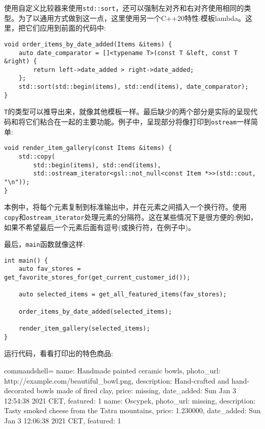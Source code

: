 使用自定义比较器来使用\texttt{std::sort}，还可以强制左对齐和右对齐使用相同的类型。为了以通用方式做到这一点，这里使用另一个C++20特性:模板lambda。这里，把它们应用到前面的代码中:

\begin{lstlisting}[style=styleCXX]
void order_items_by_date_added(Items &items) {
	auto date_comparator = []<typename T>(const T &left, const T &right) {
		return left->date_added > right->date_added;
	};
	std::sort(std::begin(items), std::end(items), date_comparator);
}
\end{lstlisting}

\texttt{T}的类型可以推导出来，就像其他模板一样。最后缺少的两个部分是实际的呈现代码和将它们粘合在一起的主要功能。例子中，呈现部分将像打印到\texttt{ostream}一样简单:

\begin{lstlisting}[style=styleCXX]
void render_item_gallery(const Items &items) {
	std::copy(
		std::begin(items), std::end(items),
		std::ostream_iterator<gsl::not_null<const Item *>>(std::cout, "\n"));
}
\end{lstlisting}

本例中，将每个元素复制到标准输出中，并在元素之间插入一个换行符。使用\texttt{copy}和\texttt{ostream\_iterator}处理元素的分隔符。这在某些情况下是很方便的;例如，如果不希望最后一个元素后面有逗号(或换行符，在例子中)。

最后，\texttt{main}函数就像这样:

\begin{lstlisting}[style=styleCXX]
int main() {
	auto fav_stores = get_favorite_stores_for(get_current_customer_id());
	
	auto selected_items = get_all_featured_items(fav_stores);
	
	order_items_by_date_added(selected_items);
	
	render_item_gallery(selected_items);
}
\end{lstlisting}

运行代码，看看打印出的特色商品:

\begin{tcblisting}{commandshell={}}
name: Handmade painted ceramic bowls, photo_url:
http://example.com/beautiful_bowl.png, description: Hand-crafted and hand-
decorated bowls made of fired clay, price: missing, date_added: Sun Jan 3
12:54:38 2021 CET, featured: 1
name: Oscypek, photo_url: missing, description: Tasty smoked cheese from
the Tatra mountains, price: 1.230000, date_added: Sun Jan 3 12:06:38 2021
CET, featured: 1
\end{tcblisting}

